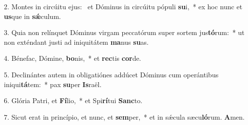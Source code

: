 2. Montes in circúitu ejus: \dag\  et Dóminus in circúitu pópuli \textbf{su}i,~*  ex hoc nunc et \textbf{us}que in \textbf{sǽ}culum.\

3. Quia non relínquet Dóminus virgam peccatórum super sortem jus\textbf{tó}rum:~*  ut non exténdant justi ad iniquitátem \textbf{ma}nus \textbf{su}as.\

4. Bénefac, Dómine, \textbf{bo}nis,~*  et \textbf{rec}tis \textbf{cor}de.\

5. Declinántes autem in obligatiónes addúcet Dóminus cum operántibus iniqui\textbf{tá}tem:~*  pax \textbf{su}per \textbf{Is}raël.\

6. Glória Patri, et \textbf{Fí}lio,~*  et Spi\textbf{rí}tui \textbf{Sanc}to.\

7. Sicut erat in princípio, et nunc, et \textbf{sem}per,~*  et in sǽcula sæcu\textbf{ló}rum. \textbf{A}men.\


